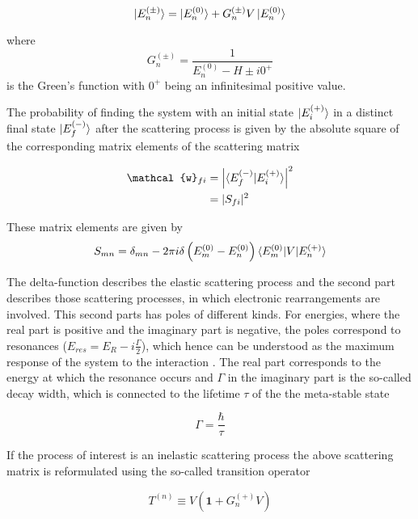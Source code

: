 \begin{equation} \label{equation:LippmannSchwinger}
 \ket{E_n^{(\pm)}} =  \ket{E_n^{(0)}} + G_n^{(\pm)}V \ket{E_n^{(0)}}
\end{equation}

where
\begin{equation}
 G_n^{(\pm)} = \frac{1}{E_n^{(0)}-H \pm i0^+}
\end{equation}
is the Green's function with $0^+$ being an infinitesimal positive value.

The probability of finding the system with an initial state $\ket{E_i^{(+)}}$
in a distinct final state $\ket{E_f^{(-)}}$ after the scattering process
is given by the absolute square of the corresponding matrix elements
of the scattering matrix

\begin{align}
 \mathcal{w}_{fi} &= \left | \braket{E_f^{(-)} | E_i^{(+)}} \right|^2\\
                  &= |S_{fi}|^2
\end{align}

These matrix elements are given by
\begin{equation}
 S_{mn} = \delta_{mn} - 2\pi i \delta \left(E_m^{(0)} - E_n^{(0)} \right)
          \braket{E_m^{(0)}| V |E_n^{(+)}}
\end{equation}

The delta-function describes the elastic scattering process and the second
part describes those scattering processes, in which electronic rearrangements
are involved. This second parts has poles of different kinds. For energies,
where the real part is positive and the imaginary part is negative, the poles
correspond to resonances ($E_{res}=E_R - i\frac{\Gamma}{2}$),
which hence can be understood as the maximum
response of the system to the interaction \cite{Klaiman12}. 
The real part corresponds to the
energy at which the resonance occurs and $\Gamma$ in the imaginary part
is the so-called decay width, which is connected to the lifetime
$\tau$ of the the meta-stable state

\begin{equation}
 \Gamma = \frac{\hbar}{\tau}
\end{equation}

If the process of interest is an inelastic scattering process the
above scattering matrix is reformulated using the so-called transition
operator

\begin{equation}
 T^{(n)} \equiv V \left( \mathbf{1} + G_n^{(+)} V \right)
\end{equation}

